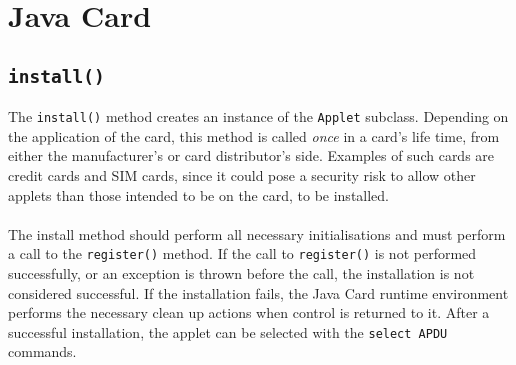 \section{Java Card}\label{sec:jc}
\subsection{\texttt{install()}}
The \texttt{install()} method creates an instance of the \texttt{Applet} subclass. Depending on the application of the card, this method is called \textit{once} in a card's life time, from either the manufacturer's or card distributor's side. Examples of such cards are credit cards and SIM cards, since it could pose a security risk to allow other applets than those intended to be on the card, to be installed.\\\\
The install method should perform all necessary initialisations and must perform a call to the \texttt{register()} method. If the call to \texttt{register()} is not performed successfully, or an exception is thrown before the call, the installation is not considered successful. If the installation fails, the Java Card runtime environment performs the necessary clean up actions when control is returned to it. After a successful installation, the applet can be selected with the \texttt{select APDU} commands.